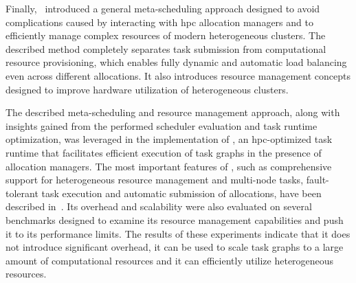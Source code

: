 Finally,~ introduced a general meta-scheduling approach designed to avoid
complications caused by interacting with \gls{hpc} allocation managers and to efficiently manage
complex resources of modern heterogeneous clusters. The described method completely separates task
submission from computational resource provisioning, which enables fully dynamic and automatic load
balancing even across different allocations. It also introduces resource management concepts
designed to improve hardware utilization of heterogeneous clusters.

The described meta-scheduling and resource management approach, along with insights gained from
the performed scheduler evaluation and task runtime optimization, was leveraged in the
implementation of \hyperqueue{}, an \gls{hpc}-optimized task runtime that facilitates
efficient execution of task graphs in the presence of allocation managers. The most important
features of \hyperqueue{}, such as comprehensive support for heterogeneous resource management and
multi-node tasks, fault-tolerant task execution and automatic submission of allocations, have been described in~. Its overhead and scalability were also evaluated on several benchmarks designed to
examine its resource management capabilities and push it to its performance limits. The results of
these experiments indicate that it does not introduce significant overhead, it can be used to
scale task graphs to a large amount of computational resources and it can
efficiently utilize heterogeneous resources.

